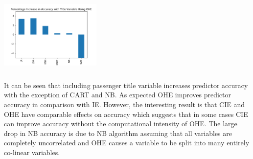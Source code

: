\documentclass{article}
\begin{document}
\includegraphics[width=5cm, height=4cm]{Percentage_Increase_in_Accuracy_with_Title_Variable_Using_OHE}
\par
It can be seen that including passenger title variable increases predictor accuracy with the exception of CART and NB. As expected OHE improves predictor accuracy in comparison with IE. However, the interesting result is that CIE and OHE have comparable effects on accuracy which suggests that in some cases CIE can improve accuracy without the computational intensity of OHE. The large drop in NB accuracy is due to NB algorithm assuming that all variables are completely uncorrelated and OHE causes a variable to be split into many entirely co-linear variables.
\par
\end{document}
